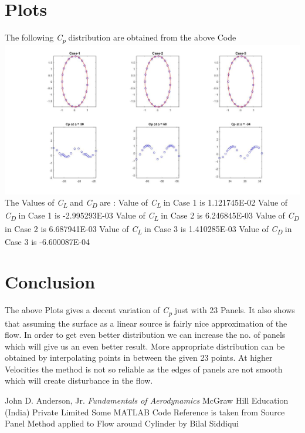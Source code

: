 \documentclass[a4paper]{article}
\begin{document}

\pagebreak
\section{Plots}
\label{sec:plots}
The following \textit{C\textsubscript{p}} distribution are obtained from the above Code
\newline
\includegraphics[scale=0.3]{Plots.jpg}
\newline
The Values of \textit{C\textsubscript{L}} and \textit{C\textsubscript{D}} are :
\newline
Value of \textit{C\textsubscript{L}} in Case 1 is 1.121745E-02
\newline
Value of \textit{C\textsubscript{D}} in Case 1 is -2.995293E-03 
\newline
Value of \textit{C\textsubscript{L}} in Case 2 is 6.246845E-03 
\newline
Value of \textit{C\textsubscript{D}} in Case 2 is 6.687941E-03
\newline
Value of \textit{C\textsubscript{L}} in Case 3 is 1.410285E-03
\newline
Value of \textit{C\textsubscript{D}} in Case 3 is -6.600087E-04 
\newline
\section{Conclusion}
\label{sec:Conclusion}
The above Plots gives a decent variation of \textit{C\textsubscript{p}} just with 23 Panels. It also shows that assuming the surface as a linear source is fairly nice approximation of the flow. In order to get even better distribution we can increase the no. of panels which will give us an even better result. More appropriate distribution can be obtained by interpolating points in between the given 23 points. At higher Velocities the method is not so reliable as the edges of panels are not smooth which will create disturbance in the flow.    


\pagebreak

\begin{thebibliography}{9}
  John D. Anderson, Jr.
  \emph{Fundamentals of Aerodynamics}
  McGraw Hill Education (India) Private Limited
  Some MATLAB Code Reference is taken from Source Panel Method 
  applied to Flow around Cylinder by Bilal Siddiqui
\end{thebibliography}
\end{document}
